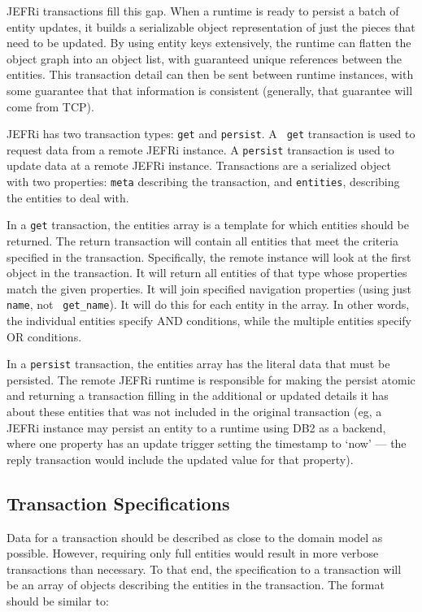 \documentclass{article}
\newcommand{\ilcode}{\tt}
\begin{document}
JEFRi transactions fill this gap. When a runtime is ready to persist a batch
of entity updates, it builds a serializable object representation of just the
pieces that need to be updated. By using entity keys extensively, the runtime
can flatten the object graph into an object list, with guaranteed unique
references between the entities. This transaction detail can then be sent
between runtime instances, with some guarantee that that information is
consistent (generally, that guarantee will come from TCP).

JEFRi has two transaction types: {\ilcode get} and {\ilcode persist}. A {\ilcode
get} transaction is used to request data from a remote JEFRi instance. A
{\ilcode persist} transaction is used to update data at a remote JEFRi instance.
Transactions are a serialized object with two properties: {\ilcode meta}
describing the transaction, and {\ilcode entities}, describing the entities to
deal with.

In a {\ilcode get} transaction, the entities array is a template for which
entities should be returned. The return transaction will contain all entities
that meet the criteria specified in the transaction. Specifically, the remote
instance will look at the first object in the transaction. It will return all
entities of that type whose properties match the given properties. It will join
specified navigation properties (using just {\ilcode name}, not {\ilcode
get\_name}). It will do this for each entity in the array. In other words, the
individual entities specify AND conditions, while the multiple entities specify
OR conditions.

In a {\ilcode persist} transaction, the entities array has the literal data that
must be persisted. The remote JEFRi runtime is responsible for making the
persist atomic and returning a transaction filling in the additional or updated
details it has about these entities that was not included in the original
transaction (eg, a JEFRi instance may persist an entity to a runtime using DB2
as a backend, where one property has an update trigger setting the timestamp to
`now' --- the reply transaction would include the updated value for that
property).

\subsection{Transaction Specifications}

Data for a transaction should be described as close to the domain model as
possible. However, requiring only full entities would result in more verbose
transactions than necessary. To that end, the specification to a transaction
will be an array of objects describing the entities in the transaction. The
format should be similar to:
\end{document}
